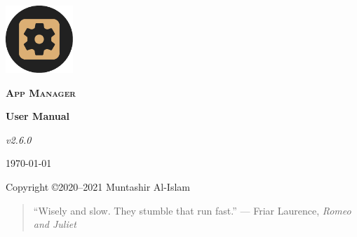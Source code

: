 \begin{titlingpage}
    \pagecolor{SunTan}
    \begin{center}
        \includegraphics[width=1in]{images/icon}\par\vspace{1cm}
        {\Huge\textbf{\textsc{App Manager}}\par}
        \vspace{2.5cm}
        {\huge\bfseries User Manual\par}
        \vspace{.5cm}
        {\Large\itshape v2.6.0\par}
        \vfill
        {\large \today\par}
        \vfill
        {Copyright \copyright 2020--2021 Muntashir Al-Islam\par}
        \pagebreak
        \pagecolor{white}
        \begin{quotation}
            ``Wisely and slow. They stumble that run fast.''
                {--- Friar Laurence, \textit{Romeo and Juliet}}
        \end{quotation}
    \end{center}
\end{titlingpage}
